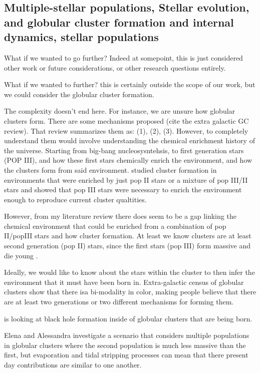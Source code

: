     \subsection{Multiple-stellar populations, Stellar evolution, and globular cluster formation and internal dynamics, stellar populations}

        What if we wanted to go further? Indeed at somepoint, this is just considered other work or future considerations, or other research questions entirely. 

        What if we wanted to further? this is certainly outside the scope of our work, but we could consider the globular cluster formation. 

        The complexity doesn't end here. For instance, we are unsure how globular clusters form. There are some mechanisms proposed (cite the extra galactic GC review). That review summarizes them as: (1), (2), (3). However, to completely understand them would involve understanding the chemical enrichment history of the universe. Starting from big-bang nucleosysntehsis, to first generation stars (POP III), and how these first stars chemically enrich the environment, and how the clusters form from said environment. \citet{2022A&A...668A.191C} studied cluster formation in environments that were enriched by just pop II stars or a mixture of pop III/II stars and showed that pop III stars were necessary to enrich the environment enough to reproduce current cluster qualtities. 

        However, from my literature review there does seem to be a gap linking the chemical environment that could be enriched from a combination of pop II/popIII stars and how cluster formation. At least we know clusters are at least second generation (pop II) stars, since the first stars (pop III) form massive and die young \citep{2002ApJ...571...30S}.

        Ideally, we would like to know about the stars within the cluster to then infer the environment that it must have been born in. Extra-galactic census of globular clusters show that there isa bi-modality in color, making people believe that there are at least two generations or two different mechanisms for forming them. 

        \citet{2025arXiv250507491V} is looking at black hole formation inside of globular clusters that are being born. 

        \citet{2024A&A...681A..45L} Elena and Alessandra investigate a scenario that considers multiple populations in globular clusters where the second population is much less massive than the first, but evaporation and tidal stripping processes can mean that there present day contributions are similar to one another. 


